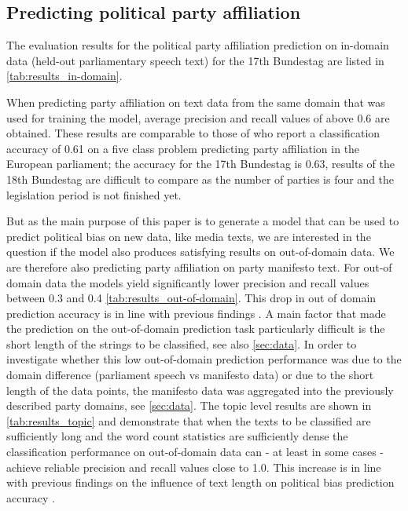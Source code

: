 \documentclass{article}
\begin{document}
\subsection{Predicting political party affiliation}
The evaluation results for the political party affiliation prediction on in-domain data (held-out parliamentary speech text) for the 17th Bundestag are listed in \autoref{tab:results_in-domain}.

When predicting party affiliation on text data from the same domain that was used for training the model, average precision and recall values of above 0.6 are obtained. These results are comparable to those of \cite{Hirst2014} who report a classification accuracy of 0.61 on a five class problem predicting party affiliation in the European parliament; the accuracy for the 17th Bundestag is 0.63, results of the 18th Bundestag are difficult to compare as the number of parties is four and the legislation period is not finished yet.

But as the main purpose of this paper is to generate a model that can be used to predict political bias on new data, like media texts, we are interested in the question if the model also produces satisfying results on out-of-domain data. We are therefore also predicting party affiliation on party manifesto text. For out-of domain data the models yield significantly lower precision and recall values between 0.3 and 0.4 \autoref{tab:results_out-of-domain}. This drop in out of domain prediction accuracy is in line with previous findings \cite{Yu2008}.
A main factor that made the prediction on the out-of-domain prediction task particularly difficult is the short length of the strings to be classified, see also \autoref{sec:data}. In order to investigate whether this low out-of-domain prediction performance was due to the domain difference (parliament speech vs manifesto data) or due to the short length of the data points, the manifesto data was aggregated into the previously described party domains, see \autoref{sec:data}. The topic level results are shown in \autoref{tab:results_topic} and demonstrate that when the texts to be classified are sufficiently long and the word count statistics are sufficiently dense the classification performance on out-of-domain data can - at least in some cases - achieve reliable precision and recall values close to 1.0. This increase is in line with previous findings on the influence of text length on political bias prediction accuracy \cite{Hirst2014}.
\end{document}
